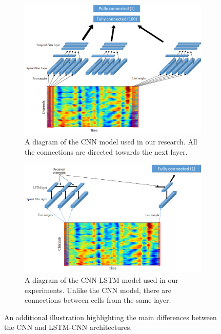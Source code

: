 \documentclass[
12pt, %
english, %
doublespacing, %
headsepline, %
]{MastersDoctoralThesis} %
\begin{document}
\begin{figure}
	\centering
	\begin{subfigure}[t]{1.0\textwidth}
			\centering
	\includegraphics[width=1.1\linewidth]{Figures/CNN_detailed}
	\caption{A diagram of the CNN model used in our research. All the connections are directed towards the next layer.}
	\label{fig:CNN_detailed}
	\end{subfigure}
	\begin{subfigure}[t]{1.0\textwidth}
		\centering
		\includegraphics[width=1.1\linewidth]{Figures/LSTM_CNN_detailed}
		\caption{A diagram of the CNN-LSTM model used in our experiments. Unlike the CNN model, there are connections between cells from the same layer.}
		\label{fig:LSTM_CNN_detailed}
	\end{subfigure}

	\caption{An additional illustration highlighting the main differences between the CNN and LSTM-CNN architectures.}
\end{figure}
\end{document}
